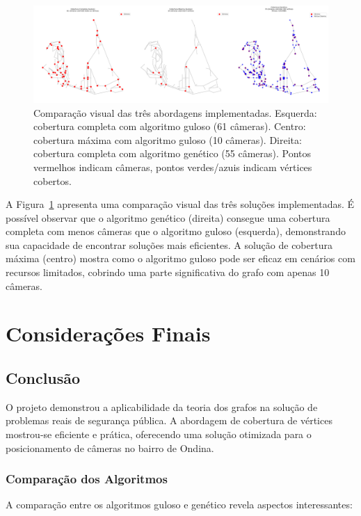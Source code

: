 \documentclass[12pt, a4paper]{report}
\begin{document}
\begin{figure}[H]
    \centering
    \includegraphics[width=\textwidth]{visualizacao_comparacao}
    \caption{Comparação visual das três abordagens implementadas. Esquerda: cobertura completa com algoritmo guloso (61 câmeras). Centro: cobertura máxima com algoritmo guloso (10 câmeras). Direita: cobertura completa com algoritmo genético (55 câmeras). Pontos vermelhos indicam câmeras, pontos verdes/azuis indicam vértices cobertos.}
    \label{fig:visualizacao_comparacao}
\end{figure}

A Figura~\ref{fig:visualizacao_comparacao} apresenta uma comparação visual das três soluções implementadas. É possível observar que o algoritmo genético (direita) consegue uma cobertura completa com menos câmeras que o algoritmo guloso (esquerda), demonstrando sua capacidade de encontrar soluções mais eficientes. A solução de cobertura máxima (centro) mostra como o algoritmo guloso pode ser eficaz em cenários com recursos limitados, cobrindo uma parte significativa do grafo com apenas 10 câmeras.

\chapter{Considerações Finais}

\section{Conclusão}
O projeto demonstrou a aplicabilidade da teoria dos grafos na solução de problemas reais de segurança pública. A abordagem de cobertura de vértices mostrou-se eficiente e prática, oferecendo uma solução otimizada para o posicionamento de câmeras no bairro de Ondina.

\subsection{Comparação dos Algoritmos}
A comparação entre os algoritmos guloso e genético revela aspectos interessantes:
\end{document}
